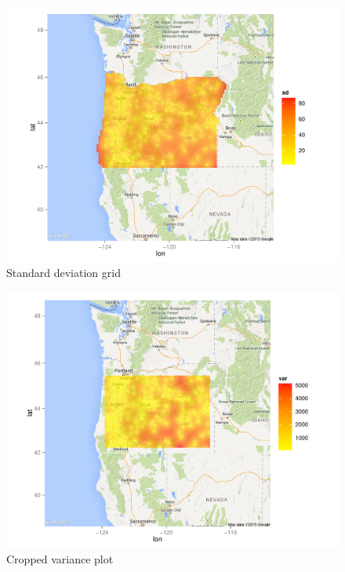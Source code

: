 \documentclass[12pt,twoside]{reedthesis}
\begin{document}
\begin{figure}[h!]
	   
	       \centering
	  
	    \includegraphics[scale=0.7]{sd_plot}
	
	     \caption{Standard deviation grid}
	 \label{sd}
	\end{figure}
	
\begin{figure}[h!]
	   
	       \centering
	  
	    \includegraphics[scale=0.7]{var_crop}
	
	     \caption{Cropped variance plot}
	 \label{varcrop}
	\end{figure}
	
\end{document}
